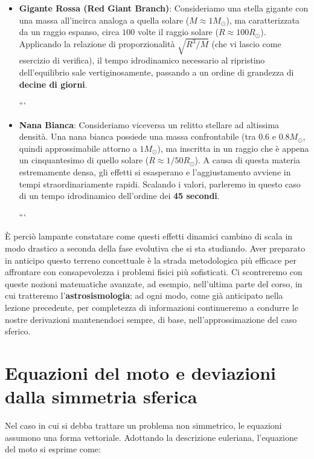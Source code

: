 \begin{itemize}
\item \textbf{Gigante Rossa (Red Giant Branch)}: Consideriamo una stella gigante con una massa all'incirca analoga a quella solare ($M \approx 1 M_\odot$), ma caratterizzata da un raggio espanso, circa $100$ volte il raggio solare ($R \approx 100 R_\odot$). Applicando la relazione di proporzionalità $\sqrt{R^3/M}$ (che vi lascio come esercizio di verifica), il tempo idrodinamico necessario al ripristino dell'equilibrio sale vertiginosamente, passando a un ordine di grandezza di \textbf{decine di giorni}.

```
\item \textbf{Nana Bianca}: Consideriamo viceversa un relitto stellare ad altissima densità. Una nana bianca possiede una massa confrontabile (tra $0.6$ e $0.8 M_\odot$, quindi approssimabile attorno a $1 M_\odot$), ma inscritta in un raggio che è appena un cinquantesimo di quello solare ($R \approx 1/50 R_\odot$). A causa di questa materia estremamente densa, gli effetti si esasperano e l'aggiustamento avviene in tempi straordinariamente rapidi. Scalando i valori, parleremo in questo caso di un tempo idrodinamico dell'ordine dei \textbf{45 secondi}.

```

\end{itemize}

È perciò lampante constatare come questi effetti dinamici cambino di scala in modo drastico a seconda della fase evolutiva che si sta studiando. Aver preparato in anticipo questo terreno concettuale è la strada metodologica più efficace per affrontare con consapevolezza i problemi fisici più sofisticati. Ci scontreremo con queste nozioni matematiche avanzate, ad esempio, nell'ultima parte del corso, in cui tratteremo l'\textbf{astrosismologia}; ad ogni modo, come già anticipato nella lezione precedente, per completezza di informazioni continueremo a condurre le nostre derivazioni mantenendoci sempre, di base, nell'approssimazione del caso sferico.

\section{Equazioni del moto e deviazioni dalla simmetria sferica}

Nel caso in cui si debba trattare un problema non simmetrico, le equazioni assumono una forma vettoriale. Adottando la descrizione euleriana, l'equazione del moto si esprime come:

